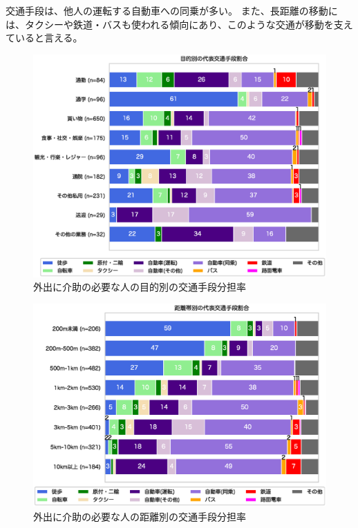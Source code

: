\documentclass[a4paper,12pt, uplatex]{jsbook}
\begin{document}
\clearpage
交通手段は、他人の運転する自動車への同乗が多い。
また、長距離の移動には、タクシーや鉄道・バスも使われる傾向にあり、このような交通が移動を支えていると言える。
%
\begin{figure}[H]
    \centering
    \includegraphics[width=1.0\textwidth]{picture/mode_share_purpose_介助.eps}
    \caption{外出に介助の必要な人の目的別の交通手段分担率}
    \label{fig:mode_share_purpose_care}
\end{figure}
%
\begin{figure}[H]
    \centering
    \includegraphics[width=1.0\textwidth]{picture/mode_share_distance_介助.eps}
    \caption{外出に介助の必要な人の距離別の交通手段分担率}
    \label{fig:mode_share_dist_care}
\end{figure}
\end{document}
